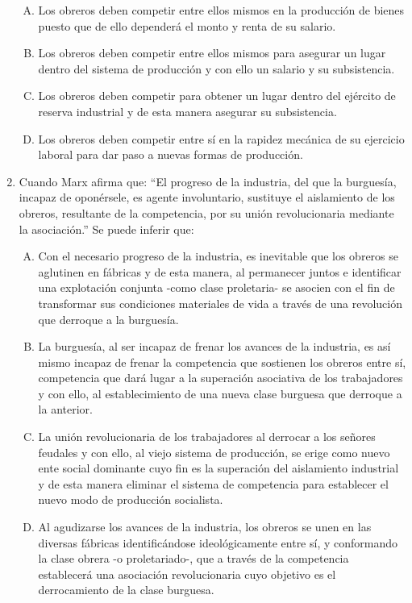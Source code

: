 \begin{enumerate}
\begin{enumerate}[(A)]

\item Los obreros deben competir entre ellos mismos en la producción de bienes puesto que de ello dependerá el monto y renta de su salario.
\item Los obreros deben competir entre ellos mismos para asegurar un lugar dentro del sistema de producción y con ello un salario y su subsistencia.
\item Los obreros deben competir para obtener un lugar dentro del ejército de reserva industrial y de esta manera asegurar su subsistencia.
\item Los obreros deben competir entre sí en la rapidez mecánica de su ejercicio laboral para dar paso a nuevas formas de producción.
\end{enumerate}

\item Cuando Marx afirma que: “El progreso de la industria, del que la burguesía, incapaz de oponérsele, es agente involuntario, sustituye el aislamiento de los obreros, resultante de la competencia, por su unión revolucionaria mediante la asociación.” Se puede inferir que:\label{socandres-9}

\begin{enumerate}[(A)]
\item Con el necesario progreso de la industria, es inevitable que los obreros se aglutinen en fábricas y de esta manera, al permanecer juntos e identificar una explotación conjunta -como clase proletaria- se asocien con el fin de transformar sus condiciones materiales de vida a través de una revolución que derroque a la burguesía.
\item La burguesía, al ser incapaz de frenar los avances de la industria, es así mismo incapaz de frenar la competencia que sostienen los obreros entre sí, competencia que dará lugar a la superación asociativa de los trabajadores y con ello, al establecimiento de una nueva clase burguesa que derroque a la anterior.
\item La unión revolucionaria de los trabajadores al derrocar a los señores feudales y con ello, al viejo sistema de producción, se erige como nuevo ente social dominante cuyo fin es la superación del aislamiento industrial y de esta manera eliminar el sistema de competencia para establecer el nuevo modo de producción socialista.
\item Al agudizarse los avances de la industria, los obreros se unen en las diversas fábricas identificándose ideológicamente entre sí, y conformando la clase obrera -o proletariado-, que a través de la competencia establecerá una asociación revolucionaria cuyo objetivo es el derrocamiento de la clase burguesa.     
\end{enumerate}


\end{enumerate}
